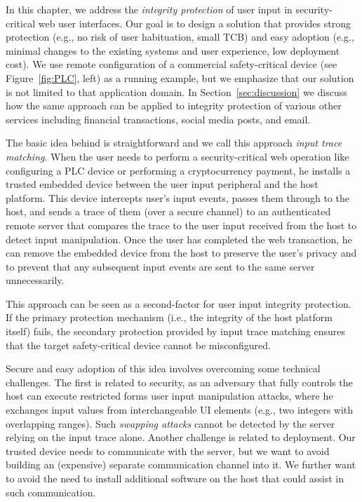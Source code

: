  In this chapter, we address the \emph{integrity protection} of user input in security-critical web user interfaces. Our goal is to design a solution that provides strong protection (e.g., no risk of user habituation, small TCB) and easy adoption (e.g., minimal changes to the existing systems and user experience, low deployment cost). We use remote configuration of a commercial safety-critical device (see Figure~\ref{fig:PLC}, left) as a running example, but we emphasize that our solution is not limited to that application domain. In Section~\ref{sec:discussion} we discuss how the same approach can be applied to integrity protection of various other services including financial transactions, social media posts, and email.

The basic idea behind \name is straightforward and we call this approach \emph{input trace matching}.  When the user needs to perform a security-critical web operation like configuring a PLC device or performing a cryptocurrency payment, he installs a trusted embedded device between the user input peripheral and the host platform. This device intercepts user's input events, passes them through to the host, and sends a trace of them (over a secure channel) to an authenticated remote server that compares the trace to the user input received from the host to detect input manipulation. Once the user has completed the web transaction, he can remove the embedded device from the host to preserve the user's privacy and to prevent that any subsequent input events are sent to the same server unnecessarily.

This approach can be seen as a second-factor for user input integrity protection. If the primary protection mechanism (i.e., the integrity of the host platform itself) fails, the secondary protection provided by input trace matching ensures that the target safety-critical device cannot be misconfigured.

Secure and easy adoption of this idea involves overcoming some technical challenges. The first is related to security, as an adversary that fully controls the host can execute restricted forms user input manipulation attacks, where he exchanges input values from interchangeable UI elements (e.g., two integers with overlapping ranges). Such \emph{swapping attacks} cannot be detected by the server relying on the input trace alone. Another challenge is related to deployment. Our trusted device needs to communicate with the server, but we want to avoid building an (expensive) separate communication channel into it. We further want to avoid the need to install additional software on the host that could assist in such communication. 


